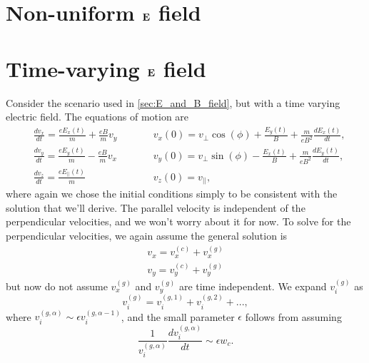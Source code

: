 \documentclass[a4paper,11pt]{report}
\begin{document}
\section{Non-uniform $\mathbf{E}$ field}

\section{Time-varying $\mathbf{E}$ field}
Consider the scenario used in \cref{sec:E_and_B_field}, but with a time varying electric field. The equations of motion are
\begin{subequations}
\label{eq:time_var_E_temp1}
\begin{alignat}{2}
    &\frac{d v_x}{dt} = \frac{eE_x(t)}{m} + \frac{eB}{m} v_y  \qquad && v_x(0) = v_\perp \cos(\phi) + \frac{E_y(t)}{B} + \frac{m}{eB^2}\frac{dE_x(t)}{dt},  \\
    &\frac{d v_y}{dt} = \frac{eE_y(t)}{m} - \frac{eB}{m} v_x  \qquad && v_y(0) = v_\perp \sin(\phi) - \frac{E_x(t)}{B} + \frac{m}{eB^2}\frac{dE_y(t)}{dt},  \\
    &\frac{d v_z}{dt} = \frac{e E_{||}(t)}{m}  \qquad && v_z(0) = v_{||}, 
\end{alignat}
\end{subequations}
where again we chose the initial conditions simply to be consistent with the solution that we'll derive. The parallel velocity is independent of the perpendicular velocities, and we won't worry about it for now. To solve for the perpendicular velocities, we again assume the general solution is 
\begin{align}
\label{eq:time_var_temp2}
    v_x = v_x^{(c)} + v_x^{(g)} \nonumber \\
    v_y = v_y^{(c)} + v_y^{(g)} 
\end{align}
but now do not assume $v_x^{(g)}$ and $v_y^{(g)}$ are time independent. We expand $v_i^{(g)}$ as 
\begin{equation}
    v_i^{(g)} = v^{(g,1)}_i +  v^{(g,2)}_i + ...,
\end{equation}
where $v_i^{(g,\alpha)} \sim \epsilon v_i^{(g,\alpha-1)}$, and the small parameter $\epsilon$ follows from assuming 
\begin{equation}
\label{eq:time_var_E_temp3}
    \frac{1}{v^{(g,\alpha)}_i} \frac{d v^{(g,\alpha)}_i}{dt} \sim \epsilon w_c.
\end{equation}
\end{document}
